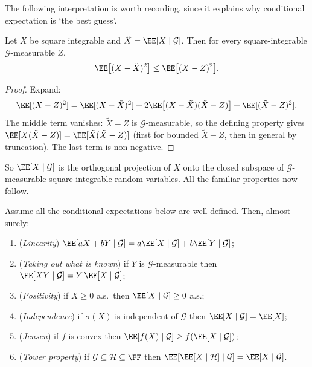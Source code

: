 The following interpretation is worth recording, since it explains why conditional expectation is `the best guess'.

\begin{proposition}[$L^2$ projection]
	Let $X$ be square integrable and $\tilde X = \EE[X\mid\mathcal{G}]$. Then for every square-integrable $\mathcal{G}$-measurable $Z$,
	$$
	\EE\big[(X-\tilde X)^2\big] \leq \EE\big[(X - Z)^2\big].
	$$
\end{proposition}

\begin{proof}
	Expand:
	$$
	\EE[(X-Z)^2] = \EE[(X - \tilde X)^2] + 2\EE\big[(X-\tilde X)(\tilde X - Z)\big] + \EE[(\tilde X - Z)^2].
	$$
	The middle term vanishes: $\tilde X - Z$ is $\mathcal{G}$-measurable, so the defining property gives $\EE[X(\tilde X - Z)] = \EE[\tilde X(\tilde X - Z)]$ (first for bounded $\tilde X - Z$, then in general by truncation). The last term is non-negative.
\end{proof}

So $\EE[X\mid\mathcal{G}]$ is the orthogonal projection of $X$ onto the closed subspace of $\mathcal{G}$-measurable square-integrable random variables. All the familiar properties now follow.

\begin{proposition}\label{prop:ce-props}
	Assume all the conditional expectations below are well defined. Then, almost surely:
	\begin{enumerate}[label=(\roman*)]
		\item (\emph{Linearity}) $\EE[aX + bY \mid \mathcal{G}] = a\EE[X\mid\mathcal{G}] + b\EE[Y\mid\mathcal{G}]$;
		\item (\emph{Taking out what is known}) if $Y$ is $\mathcal{G}$-measurable then $\EE[XY\mid\mathcal{G}] = Y\,\EE[X\mid\mathcal{G}]$;
		\item (\emph{Positivity}) if $X \geq 0$ a.s.\ then $\EE[X\mid\mathcal{G}]\geq 0$ a.s.;
		\item (\emph{Independence}) if $\sigma(X)$ is independent of $\mathcal{G}$ then $\EE[X\mid\mathcal{G}] = \EE[X]$;
		\item (\emph{Jensen}) if $f$ is convex then $\EE[f(X)\mid\mathcal{G}] \geq f(\EE[X\mid\mathcal{G}])$;
		\item (\emph{Tower property}) if $\mathcal{G}\subseteq\mathcal{H}\subseteq\FF$ then $\EE[\EE[X\mid\mathcal{H}]\mid\mathcal{G}] = \EE[X\mid\mathcal{G}]$.
	\end{enumerate}
\end{proposition}

